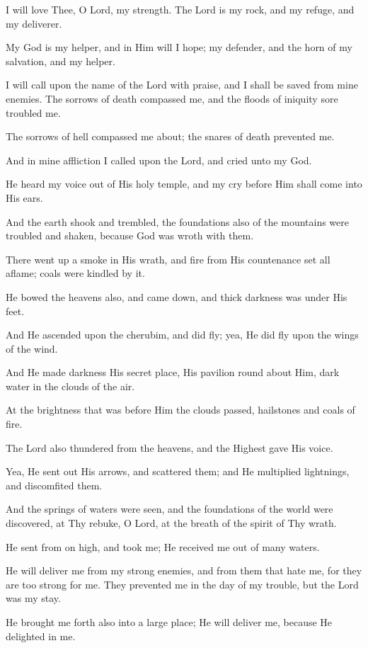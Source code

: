 I will love Thee, O Lord, my strength. The Lord is my rock, and my refuge, and my deliverer.

My God is my helper, and in Him will I hope; my defender, and the horn of my salvation, and my helper.

I will call upon the name of the Lord with praise, and I shall be saved from mine enemies. The sorrows of death compassed me, and the floods of iniquity sore troubled me.

The sorrows of hell compassed me about; the snares of death prevented me.

And in mine affliction I called upon the Lord, and cried unto my God.

He heard my voice out of His holy temple, and my cry before Him shall come into His ears.

And the earth shook and trembled, the foundations also of the mountains were troubled and shaken, because God was wroth with
them.

There went up a smoke in His wrath, and fire from His countenance set all aflame; coals were kindled by it.

He bowed the heavens also, and came down, and thick darkness was under His feet.

And He ascended upon the cherubim, and did fly; yea, He did fly upon the wings of the wind.

And He made darkness His secret place, His pavilion round about Him, dark water in the clouds of the air.

At the brightness that was before Him the clouds passed, hailstones and coals of fire.

The Lord also thundered from the heavens, and the Highest gave His voice.

Yea, He sent out His arrows, and scattered them; and He multiplied lightnings, and discomfited them.

And the springs of waters were seen, and the foundations of the world were discovered, at Thy rebuke, O Lord, at the breath of the spirit of Thy wrath.

He sent from on high, and took me; He received me out of many waters.

He will deliver me from my strong enemies, and from them that hate me, for they are too strong for me. They prevented me in the day of my trouble, but the Lord was my stay.

He brought me forth also into a large place; He will deliver me, because He delighted in me.

